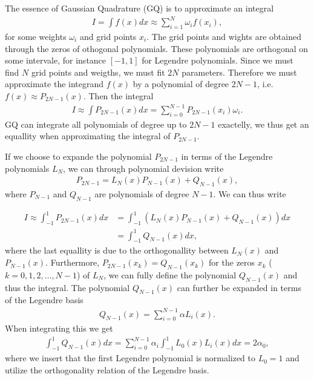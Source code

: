 \documentclass[10pt, twocolumn]{aastex62}
\begin{document}
The essence of Gaussian Quadrature (GQ) is to approximate an integral 
\begin{align}
	I = \int f(x) dx \approx \sum^N_{i = 1} \omega_i f(x_i),
	\label{eq:quadrature}
\end{align} 
for some weights $\omega_i$ and grid points $x_i$. The grid points and wights
are obtained through the zeros of othogonal polynomials. These polynomials are
orthogonal on some intervale, for instance $[-1, 1]$ for Legendre polynomials.
Since we must find $N$ grid points and weigths, we must fit $2N$ parameters.
Therefore we must approximate the integrand $f(x)$ by a polynomial of degree
$2N-1$, i.e. $f(x) \approx P_{2N-1}(x)$. Then the integral 
\begin{align}
	I \approx \int P_{2N-1}(x)dx = \sum^{N-1}_{i=0}P_{2N-1}(x_i) \omega_i.
\end{align} 
GQ can integrate all polynomials of degree up to $2N-1$ exactelly, we thus get
an equallity when approximating the integral of $P_{2N-1}$. 

If we choose to expande the polynomial $P_{2N-1}$ in terms of the Legendre
polynomials $L_N$, we can through polynomial devision write 
\begin{align}
	P_{2N-1} = L_N(x)P_{N-1}(x) + Q_{N-1}(x),
\end{align}
where $P_{N-1}$ and $Q_{N-1}$ are polynomials of degree $N-1$. We can thus write

\begin{align}
	I \approx \int^1_{-1} P_{2N-1}(x) dx &= \int^1_{-1} (L_N(x)P_{N-1}(x) + Q_{N-1}(x))dx \\
	&= \int^1_{-1}Q_{N-1}(x)dx,
\end{align}
where the last equallity is due to the orthogonallity between $L_N(x)$ and
$P_{N-1}(x)$. Furthermore, $P_{2N-1}(x_k) = Q_{N-1}(x_k)$ for the zeros $x_k$
($k = 0, 1, 2,\ldots, N-1$) of $L_N$, we can fully define the polynomial
$Q_{N-1}(x)$ and thus the integral. The polynomial $Q_{N-1}(x)$ can further be
expanded in terms of the Legendre basis 
\begin{align}
	Q_{N-1}(x) = \sum^{N-1}_{i=0} \alpha L_i(x).
	\label{eq:Qexpansion_of_x}
\end{align}
When integrating this we get
\begin{align}
	\int^1_{-1}Q_{N-1}(x)dx = \sum^{N-1}_{i=0} \alpha_i\int^1_{-1}L_0(x)L_i(x) dx = 2\alpha_0,
\end{align}
where we insert that the first Legendre polynomial is normalized to $L_0 = 1$
and utilize the orthogonality relation of the Legendre basis.
\end{document}
